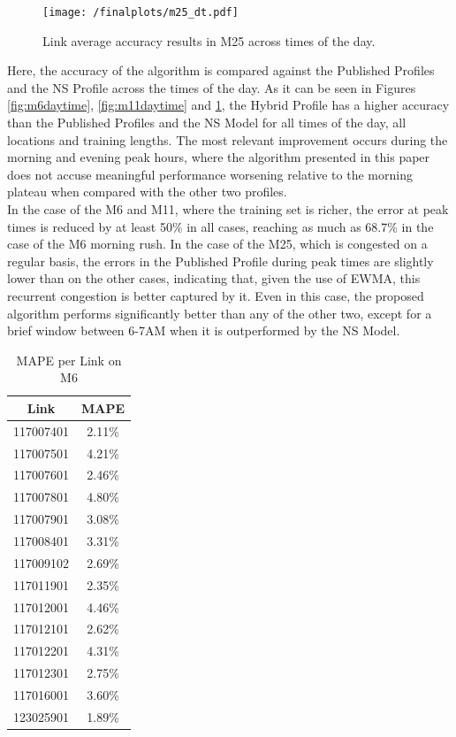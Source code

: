 \documentclass[conference, letterpaper]{IEEEtran}
\begin{document}
\begin{figure}[htbp]
	\centering
	\texttt{[image: /finalplots/m25\_dt.pdf]}
	\caption{Link average accuracy results in M25 across times of the day.}
	\label{fig:m25daytime}
\end{figure}

Here, the accuracy of the algorithm is compared against the Published Profiles and the NS Profile across the times of the day.
As it can be seen in Figures \ref{fig:m6daytime}, \ref{fig:m11daytime} and \ref{fig:m25daytime}, the Hybrid Profile has a higher accuracy than the Published Profiles and the NS Model for all times of the day, all locations and training lengths. 
The most relevant improvement occurs during the morning and evening peak hours, where the algorithm presented in this paper does not accuse meaningful performance worsening relative to the morning plateau when compared with the other two profiles.\\
In the case of the M6 and M11, where the training set is richer, the error at peak times is reduced by at least 50\% in all cases, reaching as much as 68.7\% in the case of the M6 morning rush.
In the case of the M25, which is congested on a regular basis, the errors in the Published Profile during peak times are slightly lower than on the other cases, indicating that, given the use of EWMA, this recurrent congestion is better captured by it. 
Even in this case, the proposed algorithm performs significantly better than any of the other two, except for a brief window between 6-7AM when it is outperformed by the NS Model.

\begin{table}[htbp]
	\caption{MAPE per Link on M6}
	\begin{center}
		\begin{tabular}{|c|c|}
			\hline
			\textbf{Link}&{\textbf{MAPE}} \\
			\hline
			117007401& 2.11\%\\
			\hline
			117007501& 4.21\%\\
			\hline
			117007601& 2.46\%\\
			\hline
			117007801& 4.80\%\\
			\hline
			117007901& 3.08\%\\
			\hline
			117008401& 3.31\%\\
			\hline
			117009102& 2.69\%\\
			\hline
			117011901& 2.35\%\\
			\hline
			117012001& 4.46\%\\
			\hline
			117012101& 2.62\%\\
			\hline
			117012201& 4.31\%\\
			\hline
			117012301& 2.75\%\\
			\hline
			117016001& 3.60\%\\
			\hline
			123025901& 1.89\%\\
			\hline
		\end{tabular}
		\label{tab1}
	\end{center}
	\label{table:m6mape}
\end{table}
\end{document}
